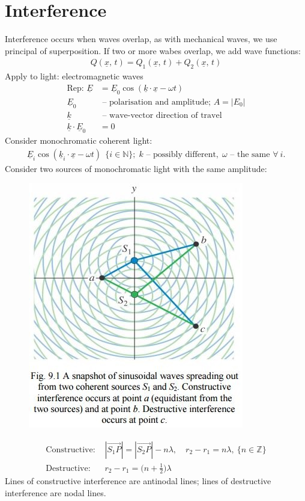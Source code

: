 \documentclass[a4paper, 11pt, normalem]{report}
\begin{document}
\section{Interference}
Interference occurs when waves overlap, as with mechanical waves, we use principal of superposition.
If two or more wabes overlap, we add wave functions:
\begin{align}
    Q(\underline{x},\,t) = Q_{1}(\underline{x},\,t) + Q_{2}(\underline{x},\,t)
\end{align}
Apply to light: electromagnetic waves
\begin{align}
    \text{Rep: }\underline{E} &= \underline{E}_{0}\cos{(\underline{k}\cdot\underline{x} - \omega t)} \\
    \underline{E}_{0}&\text{ -- polarisation and amplitude; }A = |E_{0}| \\
    \underline{k}&\text{ -- wave-vector direction of travel} \\
    \underline{k}\cdot\underline{E}_{0} &= 0
\end{align}
Consider monochromatic coherent light:
\begin{align}
    \underline{E}_{i}\cos{(\underline{k}_{i}\cdot\underline{x} - \omega t)}~~\{i \in \mathbb{N}\};\; k\text{ -- possibly different},\; \omega\text{ -- the same }\forall ~i.
\end{align}
Consider two sources of monochromatic light with the same amplitude: 
\begin{figure}[H]
    \centering
    \includegraphics{Construc.jpg}
\end{figure}
\begin{align}
    \text{Constructive: }&|\overrightarrow{S_{1}P}| = |\overrightarrow{S_{2}P}| - n\lambda,\quad r_{2} - r_{1} = n\lambda, ~\{n \in \mathbb{Z}\} \\
    \text{Destructive: }&r_{2} - r_{1} = \Big(n + \frac{1}{2}\Big)\lambda
\end{align}
Lines of constructive interference are antinodal lines; lines of destructive interference are nodal lines.
\end{document}
